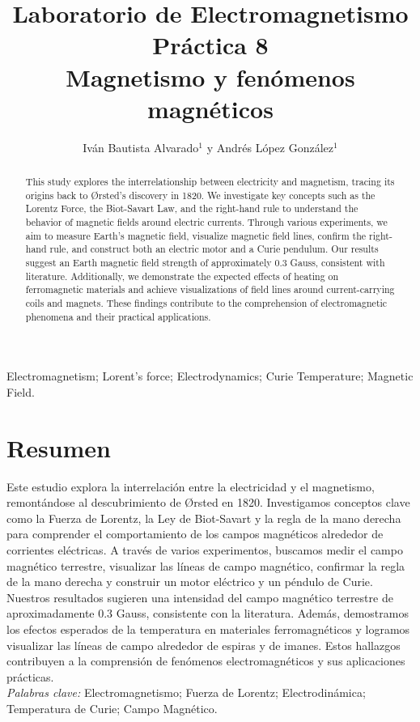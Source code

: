 \documentclass[article,12pt]{elsarticle}
\begin{document}
\begin{frontmatter}
    \title{Laboratorio de Electromagnetismo \\  Práctica  8\\ Magnetismo y fenómenos magnéticos}
    \author{Iván Bautista Alvarado$^1$ y Andrés López González$^1$} %
    \address{$^1$ Facultad de Ciencias, Universidad Nacional Autónoma de México, M\'exico CDMX.}


    \begin{abstract}
     This study explores the interrelationship between electricity and magnetism, tracing its origins back to Ørsted's discovery in 1820. We investigate key concepts such as the Lorentz Force, the Biot-Savart Law, and the right-hand rule to understand the behavior of magnetic fields around electric currents. Through various experiments, we aim to measure Earth's magnetic field, visualize magnetic field lines, confirm the right-hand rule, and construct both an electric motor and a Curie pendulum. Our results suggest an Earth magnetic field strength of approximately 0.3 Gauss, consistent with literature. Additionally, we demonstrate the expected effects of heating on ferromagnetic materials and achieve visualizations of field lines around current-carrying coils and magnets. These findings contribute to the comprehension of electromagnetic phenomena and their practical applications.
    \end{abstract}

    \begin{keyword}
     Electromagnetism; Lorent's force; Electrodynamics; Curie Temperature; Magnetic Field.
    \end{keyword}
\end{frontmatter}
\section*{Resumen}
\noindent Este estudio explora la interrelación entre la electricidad y el magnetismo, remontándose al descubrimiento de Ørsted en 1820. Investigamos conceptos clave como la Fuerza de Lorentz, la Ley de Biot-Savart y la regla de la mano derecha para comprender el comportamiento de los campos magnéticos alrededor de corrientes eléctricas. A través de varios experimentos, buscamos medir el campo magnético terrestre, visualizar las líneas de campo magnético, confirmar la regla de la mano derecha y construir un motor eléctrico y un péndulo de Curie. Nuestros resultados sugieren una intensidad del campo magnético terrestre de aproximadamente 0.3 Gauss, consistente con la literatura. Además, demostramos los efectos esperados de la temperatura en materiales ferromagnéticos y logramos visualizar las líneas de campo alrededor de espiras y de imanes. Estos hallazgos contribuyen a la comprensión de fenómenos electromagnéticos y sus aplicaciones prácticas. \\\textit{Palabras clave:} Electromagnetismo; Fuerza de Lorentz; Electrodinámica; Temperatura de Curie; Campo Magnético.\\
\hline
\end{document}
